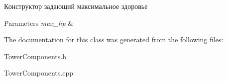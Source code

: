 Конструктор задающий максимальное здоровье 


\begin{DoxyParams}{Parameters}
{\em max\+\_\+hp} & \\
\hline
\end{DoxyParams}


The documentation for this class was generated from the following files\+:\begin{DoxyCompactItemize}
\item 
Tower\+Components.\+h\item 
Tower\+Components.\+cpp\end{DoxyCompactItemize}

